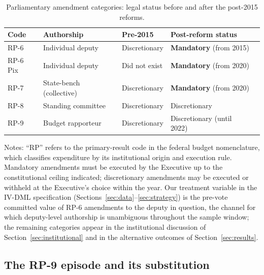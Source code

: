 \documentclass[pdflatex,sn-basic]{sn-jnl}
\begin{document}
\begin{table}[htbp]
\centering
\caption{Parliamentary amendment categories: legal status before and after the post-2015 reforms.}
\label{tab:rp_legal_status}
\small
\setlength{\tabcolsep}{5pt}
\begin{tabular}{@{}lllll@{}}
\toprule
Code & Authorship              & Pre-2015        & Post-reform status \\
\midrule
RP-6     & Individual deputy       & Discretionary   & \textbf{Mandatory} (from 2015) \\
RP-6 Pix & Individual deputy       & Did not exist   & \textbf{Mandatory} (from 2020) \\
RP-7     & State-bench (collective)& Discretionary   & \textbf{Mandatory} (from 2020) \\
RP-8     & Standing committee      & Discretionary   & Discretionary \\
RP-9     & Budget rapporteur       & Discretionary   & Discretionary (until 2022) \\
\bottomrule
\end{tabular}
\begin{tablenotes}
\small
\item Notes: ``RP'' refers to the primary-result code in the federal budget nomenclature, which classifies expenditure by its institutional origin and execution rule. Mandatory amendments must be executed by the Executive up to the constitutional ceiling indicated; discretionary amendments may be executed or withheld at the Executive's choice within the year. Our treatment variable in the IV-DML specification (Sections~\ref{sec:data}--\ref{sec:strategy}) is the pre-vote committed value of RP-6 amendments to the deputy in question, the channel for which deputy-level authorship is unambiguous throughout the sample window; the remaining categories appear in the institutional discussion of Section~\ref{sec:institutional} and in the alternative outcomes of Section~\ref{sec:results}.
\end{tablenotes}
\end{table}

\subsection{The RP-9 episode and its substitution}
\label{subsec:rp9_episode}
\end{document}
